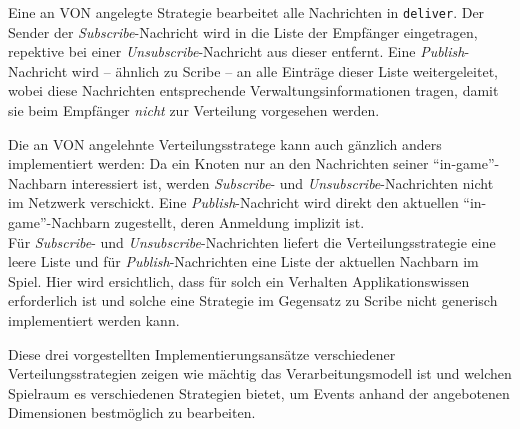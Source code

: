 Eine an VON angelegte Strategie bearbeitet alle Nachrichten in \texttt{deliver}. Der Sender der \emph{Subscribe}-Nachricht wird in die Liste der Empfänger eingetragen, repektive bei einer \emph{Unsubscribe}-Nachricht aus dieser entfernt. Eine \emph{Publish}-Nachricht wird -- ähnlich zu Scribe -- an alle Einträge dieser Liste weitergeleitet, wobei diese Nachrichten entsprechende Verwaltungsinformationen tragen, damit sie beim Empfänger \emph{nicht} zur Verteilung vorgesehen werden.

Die an VON angelehnte Verteilungsstratege kann auch gänzlich anders implementiert werden: Da ein Knoten nur an den Nachrichten seiner \enquote{in-game}-Nachbarn interessiert ist, werden \emph{Subscribe}- und \emph{Unsubscribe}-Nachrichten nicht im Netzwerk verschickt. Eine \emph{Publish}-Nachricht wird direkt den aktuellen \enquote{in-game}-Nachbarn zugestellt, deren Anmeldung implizit ist.\\
Für \emph{Subscribe}- und \emph{Unsubscribe}-Nachrichten liefert die Verteilungsstrategie eine leere Liste und für \emph{Publish}-Nachrichten eine Liste der aktuellen Nachbarn im Spiel. Hier wird ersichtlich, dass für solch ein Verhalten Applikationswissen erforderlich ist und solche eine Strategie im Gegensatz zu Scribe nicht generisch implementiert werden kann.

Diese drei vorgestellten Implementierungsansätze verschiedener Verteilungsstrategien zeigen wie mächtig das Verarbeitungsmodell ist und welchen Spielraum es verschiedenen Strategien bietet, um Events anhand der angebotenen Dimensionen bestmöglich zu bearbeiten.
